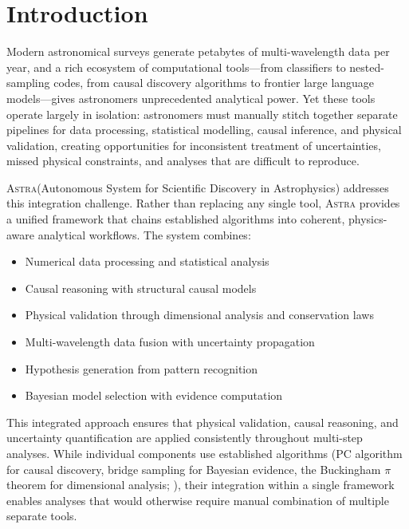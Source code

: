 \documentclass[usenatbib]{rasti}
\newcommand{\astra}{\textsc{Astra}\xspace}
\newcommand{\pc}{PC\xspace}
\begin{document}
\section{Introduction}
\label{sec:introduction}

Modern astronomical surveys generate petabytes of multi-wavelength data per year, and a rich ecosystem of computational tools---from classifiers to nested-sampling codes, from causal discovery algorithms \citep{Spirtes2000} to frontier large language models---gives astronomers unprecedented analytical power.
Yet these tools operate largely in isolation: astronomers must manually stitch together separate pipelines for data processing, statistical modelling, causal inference, and physical validation, creating opportunities for inconsistent treatment of uncertainties, missed physical constraints, and analyses that are difficult to reproduce.

\astra (Autonomous System for Scientific Discovery in Astrophysics) addresses this integration challenge.
Rather than replacing any single tool, \astra provides a unified framework that chains established algorithms into coherent, physics-aware analytical workflows.
The system combines:
\begin{itemize}
  \item Numerical data processing and statistical analysis
  \item Causal reasoning with structural causal models
  \item Physical validation through dimensional analysis and conservation laws
  \item Multi-wavelength data fusion with uncertainty propagation
  \item Hypothesis generation from pattern recognition
  \item Bayesian model selection with evidence computation
\end{itemize}

This integrated approach ensures that physical validation, causal reasoning, and uncertainty quantification are applied consistently throughout multi-step analyses.
While individual components use established algorithms (\pc algorithm for causal discovery, bridge sampling for Bayesian evidence, the Buckingham $\pi$ theorem for dimensional analysis; \citealt{Buckingham1914}), their integration within a single framework enables analyses that would otherwise require manual combination of multiple separate tools.
\end{document}
